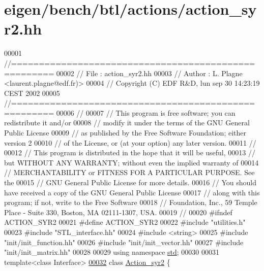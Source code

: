 \hypertarget{eigen_2bench_2btl_2actions_2action__syr2_8hh_source}{}\section{eigen/bench/btl/actions/action\+\_\+syr2.hh}
\label{eigen_2bench_2btl_2actions_2action__syr2_8hh_source}

\begin{DoxyCode}
00001 \textcolor{comment}{//=====================================================}
00002 \textcolor{comment}{// File   :  action\_syr2.hh}
00003 \textcolor{comment}{// Author :  L. Plagne <laurent.plagne@edf.fr)>}
00004 \textcolor{comment}{// Copyright (C) EDF R&D,  lun sep 30 14:23:19 CEST 2002}
00005 \textcolor{comment}{//=====================================================}
00006 \textcolor{comment}{//}
00007 \textcolor{comment}{// This program is free software; you can redistribute it and/or}
00008 \textcolor{comment}{// modify it under the terms of the GNU General Public License}
00009 \textcolor{comment}{// as published by the Free Software Foundation; either version 2}
00010 \textcolor{comment}{// of the License, or (at your option) any later version.}
00011 \textcolor{comment}{//}
00012 \textcolor{comment}{// This program is distributed in the hope that it will be useful,}
00013 \textcolor{comment}{// but WITHOUT ANY WARRANTY; without even the implied warranty of}
00014 \textcolor{comment}{// MERCHANTABILITY or FITNESS FOR A PARTICULAR PURPOSE.  See the}
00015 \textcolor{comment}{// GNU General Public License for more details.}
00016 \textcolor{comment}{// You should have received a copy of the GNU General Public License}
00017 \textcolor{comment}{// along with this program; if not, write to the Free Software}
00018 \textcolor{comment}{// Foundation, Inc., 59 Temple Place - Suite 330, Boston, MA  02111-1307, USA.}
00019 \textcolor{comment}{//}
00020 \textcolor{preprocessor}{#ifndef ACTION\_SYR2}
00021 \textcolor{preprocessor}{#define ACTION\_SYR2}
00022 \textcolor{preprocessor}{#include "utilities.h"}
00023 \textcolor{preprocessor}{#include "STL\_interface.hh"}
00024 \textcolor{preprocessor}{#include <string>}
00025 \textcolor{preprocessor}{#include "init/init\_function.hh"}
00026 \textcolor{preprocessor}{#include "init/init\_vector.hh"}
00027 \textcolor{preprocessor}{#include "init/init\_matrix.hh"}
00028 
00029 \textcolor{keyword}{using namespace }\hyperlink{namespacestd}{std};
00030 
00031 \textcolor{keyword}{template}<\textcolor{keyword}{class} Interface>
\hyperlink{class_action__syr2}{00032} \textcolor{keyword}{class }\hyperlink{class_action__syr2}{Action\_syr2} \{

\end{DoxyCode}
